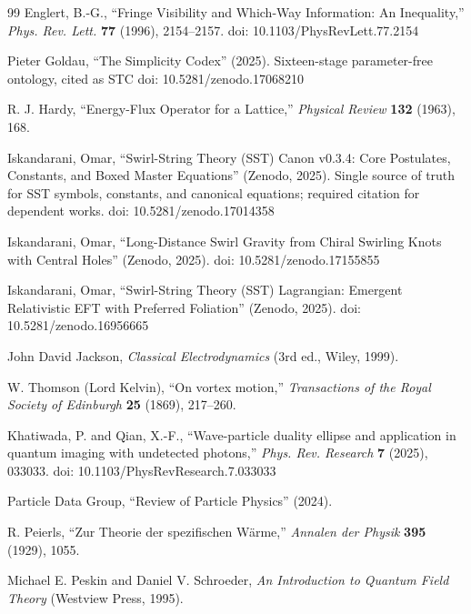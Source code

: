 \documentclass[10pt,reprint,aps,onecolumn,nofootinbib]{revtex4-2}
\begin{document}
\begin{thebibliography}{99}
    Englert, B.-G.,
    ``Fringe Visibility and Which-Way Information: An Inequality,''
    \textit{Phys. Rev. Lett.}
    \textbf{77}
    (1996), 2154--2157.
    doi: 10.1103/PhysRevLett.77.2154

    Pieter Goldau,
    ``The Simplicity Codex''
    (2025).
    Sixteen-stage parameter-free ontology, cited as STC
    doi: 10.5281/zenodo.17068210

    R. J. Hardy,
    ``Energy-Flux Operator for a Lattice,''
    \textit{Physical Review}
    \textbf{132}
    (1963), 168.

    Iskandarani, Omar,
    ``Swirl-String Theory (SST) Canon v0.3.4: Core Postulates, Constants, and Boxed Master Equations''
    (Zenodo, 2025).
    Single source of truth for SST symbols, constants, and canonical equations; required citation for dependent works.
    doi: 10.5281/zenodo.17014358

    Iskandarani, Omar,
    ``Long-Distance Swirl Gravity from Chiral Swirling Knots with Central Holes''
    (Zenodo, 2025).
    doi: 10.5281/zenodo.17155855

    Iskandarani, Omar,
    ``Swirl-String Theory (SST) Lagrangian: Emergent Relativistic EFT with Preferred Foliation''
    (Zenodo, 2025).
    doi: 10.5281/zenodo.16956665

    John David Jackson,
    \textit{Classical Electrodynamics}
    (3rd ed.,
    Wiley, 1999).

    W. Thomson (Lord Kelvin),
    ``On vortex motion,''
    \textit{Transactions of the Royal Society of Edinburgh}
    \textbf{25}
    (1869), 217--260.

    Khatiwada, P. and Qian, X.-F.,
    ``Wave-particle duality ellipse and application in quantum imaging with undetected photons,''
    \textit{Phys. Rev. Research}
    \textbf{7}
    (2025), 033033.
    doi: 10.1103/PhysRevResearch.7.033033

    Particle Data Group,
    ``Review of Particle Physics''
    (2024).

    R. Peierls,
    ``Zur Theorie der spezifischen Wärme,''
    \textit{Annalen der Physik}
    \textbf{395}
    (1929), 1055.

    Michael E. Peskin and Daniel V. Schroeder,
    \textit{An Introduction to Quantum Field Theory}
    (Westview Press, 1995).


\end{thebibliography}
\end{document}

